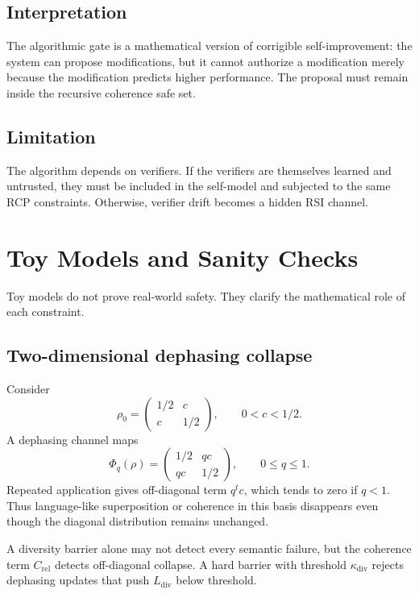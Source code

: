 \documentclass[11pt]{article}
\newcommand{\1}{\mathbf{1}}
\newcommand{\diver}{\mathrm{div}}
\newcommand{\rel}{\mathrm{rel}}
\begin{document}
\subsection{Interpretation}

The algorithmic gate is a mathematical version of corrigible self-improvement: the system can propose modifications, but it cannot authorize a modification merely because the modification predicts higher performance. The proposal must remain inside the recursive coherence safe set.

\subsection{Limitation}

The algorithm depends on verifiers. If the verifiers are themselves learned and untrusted, they must be included in the self-model and subjected to the same RCP constraints. Otherwise, verifier drift becomes a hidden RSI channel.

\section{Toy Models and Sanity Checks}

Toy models do not prove real-world safety. They clarify the mathematical role of each constraint.

\subsection{Two-dimensional dephasing collapse}

Consider
\[
\rho_0=
\begin{pmatrix}
1/2 & c\\
c & 1/2
\end{pmatrix},
\qquad
0<c<1/2.
\]
A dephasing channel maps
\[
\Phi_q(\rho)=
\begin{pmatrix}
1/2 & q c\\
q c & 1/2
\end{pmatrix},
\qquad
0\le q\le1.
\]
Repeated application gives off-diagonal term \(q^t c\), which tends to zero if \(q<1\). Thus language-like superposition or coherence in this basis disappears even though the diagonal distribution remains unchanged.

A diversity barrier alone may not detect every semantic failure, but the coherence term \(C_{\rel}\) detects off-diagonal collapse. A hard barrier with threshold \(\kappa_{\diver}\) rejects dephasing updates that push \(L_{\diver}\) below threshold.
\end{document}
